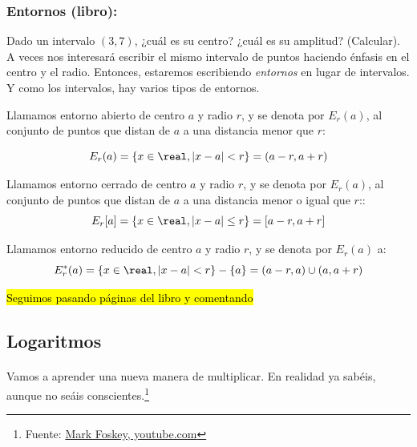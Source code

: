 \subsubsection{Entornos (libro):} Dado un intervalo $(3,7)$, ¿cuál es su centro? ¿cuál es su amplitud? (Calcular). A veces nos interesará escribir el mismo intervalo de puntos haciendo énfasis en el centro y el radio. 
%
Entonces, estaremos escribiendo \textit{entornos} en lugar de intervalos. 
%
Y como los intervalos, hay varios tipos de entornos.

\begin{defn}
Llamamos entorno abierto de centro $a$ y radio $r$, y se denota por $E_r(a)$, al conjunto de puntos que distan de $a$ a una distancia menor que $r$:

\[
	E_r(a) = \{x\in\real, |x-a| < r\} = (a-r, a+r) 
\]
\end{defn}

\begin{defn}
Llamamos entorno cerrado de centro $a$ y radio $r$, y se denota por $E_r(a)$, al conjunto de puntos que distan de $a$ a una distancia menor o igual que $r$::
\[
	E_r[a]  = \{x\in\real, |x-a| \leq r\} = [a-r, a+r]
\]
\end{defn}

\begin{defn}
Llamamos entorno reducido de centro $a$ y radio $r$, y se denota por $E_r(a)$ a:
\[
	E^{\ast}_r(a) = \{x\in\real, |x-a| < r\} - \{a\} = (a-r,a) \cup (a, a+r)
\]
\end{defn}


\hl{Seguimos pasando páginas del libro y comentando}

\subsection{Logaritmos}

\paragraph{}

Vamos a aprender una nueva manera de multiplicar. En realidad ya sabéis, aunque no seáis conscientes.\footnote{Fuente: \href{https://www.youtube.com/watch?v=FB3\_BeukBBk\&t=99s}{Mark Foskey, youtube.com}}





